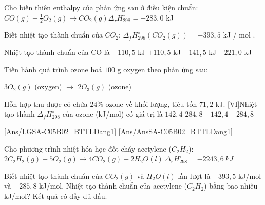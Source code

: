 \documentclass[Main.tex]{subfiles}
\begin{document}
	\begin{ex} Cho biến thiên enthalpy của phản ứng sau ở điều kiện chuẩn:
		$CO(g) + \frac{1}{2}O_2(g) \longrightarrow CO_2(g) \Delta_r H_{298}^\circ = -283{,}0$ kJ
		
		Biết nhiệt tạo thành chuẩn của $CO_2$: $\Delta_f H_{298}^\circ (CO_2(g)) = -393{,}5$ kJ / mol .
		
		Nhiệt tạo thành chuẩn của CO là
		\choice
		{\True $-110{,}5$ kJ}
		{$+110{,}5$ kJ}
		{$-141{,}5$ kJ}
		{$-221{,}0$ kJ}
	\end{ex}
	\begin{ex} Tiến hành quá trình ozone hoá $100$ g oxygen theo phản ứng sau:
		
		$3O_2(g)$ (oxygen) $\longrightarrow$ $2O_3(g)$ (ozone)
		
		Hỗn hợp thu được có chứa $24\%$ ozone về khối lượng, tiêu tốn $71{,}2$ kJ. [VI]Nhiệt tạo thành $\Delta_f H_{298}^\circ$ của ozone (kJ/mol) có giá trị là
		\choice
		{\True $142{,}4$}
		{$284{,}8$}
		{$-142{,}4$}
		{$-284{,}8$}
	\end{ex}
	[Ans/LGSA-C05B02_BTTLDang1]
	[Ans/AnsSA-C05B02_BTTLDang1]
	\begin{bt}
		Cho phương trình nhiệt hóa học đốt cháy acetylene ($C_2H_2$):
		$2C_2H_2(g) + 5O_2(g) \rightarrow 4CO_2(g) + 2H_2O(l) \ \Delta_r H_{298}^\circ = -2243{,}6 \ kJ$
		
		Biết nhiệt tạo thành chuẩn của $CO_2(g)$ và $H_2O(l)$ lần lượt là $-393{,}5$ kJ/mol và $-285{,}8$ kJ/mol. Nhiệt tạo thành chuẩn của acetylene ($C_2H_2$) bằng bao nhiêu kJ/mol? Kết quả có đầy đủ dấu.
	\end{bt}
\end{document}
